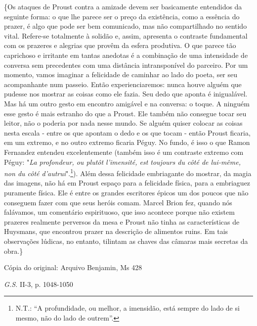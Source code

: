 \{Os ataques de Proust contra a amizade devem ser basicamente entendidos
da seguinte forma: o que lhe parece ser o preço da existência, como a
essência do prazer, é algo que pode ser bem comunicado, mas não
compartilhado no sentido vital. Refere-se totalmente à solidão e, assim,
apresenta o contraste fundamental com os prazeres e alegrias que provêm
da esfera produtiva. O que parece tão caprichoso e irritante em tantas
anedotas é a combinação de uma intensidade de conversa sem precedentes
com uma distância intransponível do parceiro. Por um momento, vamos
imaginar a felicidade de caminhar ao lado do poeta, ser seu acompanhante
num passeio. Então experienciaremos: nunca houve alguém que pudesse nos
mostrar as coisas como ele fazia. Seu dedo que aponta é inigualável. Mas
há um outro gesto em encontro amigável e na conversa: o toque. A ninguém
esse gesto é mais estranho do que a Proust. Ele também não consegue
tocar seu leitor, não o poderia por nada nesse mundo. Se alguém quiser
colocar as coisas nesta escala - entre os que apontam o dedo e os que
tocam - então Proust ficaria, em um extremo, e no outro extremo ficaria
Péguy. No fundo, é isso o que Ramon Fernandez entendeu excelentemente
(também isso é um contraste extremo com Péguy: "\emph{La profondeur, ou
plutôt l'imensité, est toujours du côté de lui-même, non du côté
d'autrui}".\footnote{N.T.: ``A profundidade, ou melhor, a imensidão,
  está sempre do lado de si mesmo, não do lado de outrem''.}). Além
dessa felicidade embriagante do mostrar, da magia das imagens, não há em
Proust espaço para a felicidade física, para a embriaguez puramente
física. Ele é entre os grandes escritores épicos um dos poucos que não
conseguem fazer com que seus heróis comam. Marcel Brion fez, quando nós
falávamos, um comentário espirituoso, que isso acontece porque não
existem prazeres realmente perversos da mesa e Proust não tinha as
características de Huysmans, que encontrou prazer na descrição de
alimentos ruins. Em tais observações lúdicas, no entanto, tilintam as
chaves das câmaras mais secretas da obra.\}

Cópia do original: Arquivo Benjamin, Ms 428

\emph{G.S.} II-3, p. 1048-1050

